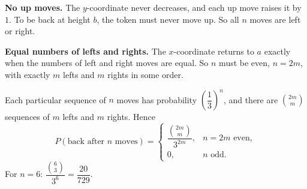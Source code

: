 \textbf{No up moves.} The $y$-coordinate never decreases, and each up move raises it by $1$. To be back at height $b$, the token must never move up. So all $n$ moves are left or right.

\textbf{Equal numbers of lefts and rights.} The $x$-coordinate returns to $a$ exactly when the numbers of left and right moves are equal. So $n$ must be even, $n=2m$, with exactly $m$ lefts and $m$ rights in some order.

Each particular sequence of $n$ moves has probability $\left(\dfrac{1}{3}\right)^n$, and there are $\binom{2m}{m}$ sequences of $m$ lefts and $m$ rights. Hence
\[
P(\text{back after }n\text{ moves})=\begin{cases}\dfrac{\binom{2m}{m}}{3^{2m}}, & n=2m\text{ even},\\[2mm] 0, & n\text{ odd}.\end{cases}
\]
For $n=6$: $\dfrac{\binom63}{3^6}=\boxed{\dfrac{20}{729}}$.
